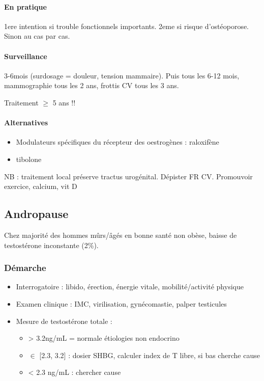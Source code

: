 \documentclass[11pt]{article}
\begin{document}
\paragraph{En pratique}
\label{sec:orgef21ce1}
1ere intention si trouble fonctionnels importants. 2eme si risque
d'ostéoporose. Sinon au cas par cas.

\paragraph{Surveillance}
\label{sec:orgc8dcf07}
3-6mois (surdosage = douleur, tension mammaire). Puis tous les 6-12 mois,
mammographie tous les 2 ans, frottis CV tous les 3 ans.

Traitement \(\ge\) 5 ans !!

\paragraph{Alternatives}
\label{sec:orga0f65d0}
\begin{itemize}
\item Modulateurs spécifiques du récepteur des oestrogènes : raloxifène
\item tibolone
\end{itemize}

NB : traitement local préserve tractus urogénital. Dépister FR CV. Promouvoir
exercice, calcium, vit D

\subsection{Andropause}
\label{sec:org3febdfe}
Chez majorité des hommes mûrs/âgés en bonne santé non obèse, baisse de
testostérone inconstante (2\%).

\subsubsection{Démarche}
\label{sec:orgff005c7}
\begin{itemize}
\item Interrogatoire : libido, érection, énergie vitale, mobilité/activité physique
\item Examen clinique : IMC, virilisation, gynécomastie, palper testicules
\item Mesure de testostérone totale :
\begin{itemize}
\item > 3.2ng/mL = normale \thus étiologies non endocrino
\item \(\in\) [2.3, 3.2] : dosier SHBG, calculer index de T libre, si bas cherche cause
\item < 2.3 ng/mL : chercher cause
\end{itemize}
\end{itemize}
\end{document}
